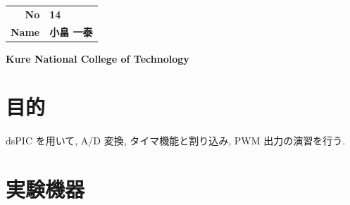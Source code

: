 \documentclass[9pt,a4paper,]{ltjsarticle}
\begin{document}
\vspace{15mm}

\begin{table}[!h]
  \begin{flushright}
    \begin{tabular}{rl}
      \textbf{No}   & \textbf{ 14 } \\
      \textbf{Name} & \textbf{ 小畠 一泰 }
    \end{tabular}
  \end{flushright}
\end{table}




\vspace{10mm}

\begin{center}
  \textbf{Kure National College of Technology}
\end{center}

\thispagestyle{empty}
\newpage
\setcounter{page}{1}

\normalsize

\hypertarget{ux76eeux7684}{%
\section{目的}\label{ux76eeux7684}}

dsPIC を用いて, A/D 変換, タイマ機能と割り込み, PWM 出力の演習を行う.

\hypertarget{ux5b9fux9a13ux6a5fux5668}{%
\section{実験機器}\label{ux5b9fux9a13ux6a5fux5668}}
\end{document}
